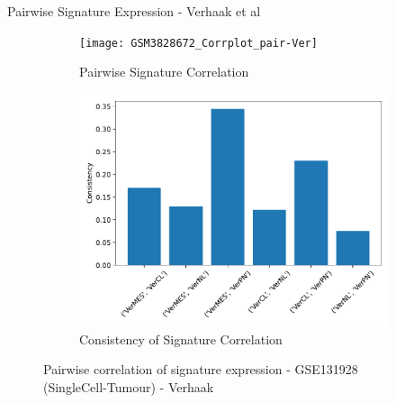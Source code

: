 \documentclass[aspectratio=169,9pt]{beamer}
\begin{document}
    \begin{frame}{Pairwise Signature Expression - Verhaak et al}
        \begin{adjustwidth}{-5cm}{-5cm}
            \centering
            \begin{figure}\ContinuedFloat
                \centering
                \begin{subfigure}[c]{0.7\textwidth}
                    \centering
                    \texttt{[image: GSM3828672\_Corrplot\_pair-Ver]}
                    \caption{Pairwise Signature Correlation}
                \end{subfigure}
                \begin{subfigure}[c]{0.4\textwidth}
                    \centering
                    \includegraphics[width=\textwidth]{GSM3828672_Consistency_Ver}
                    \caption{Consistency of Signature Correlation}
                \end{subfigure}
                \caption{Pairwise correlation of signature expression - GSE131928 (SingleCell-Tumour) - Verhaak}
            \end{figure}
        \end{adjustwidth}
    \end{frame}
\end{document}
